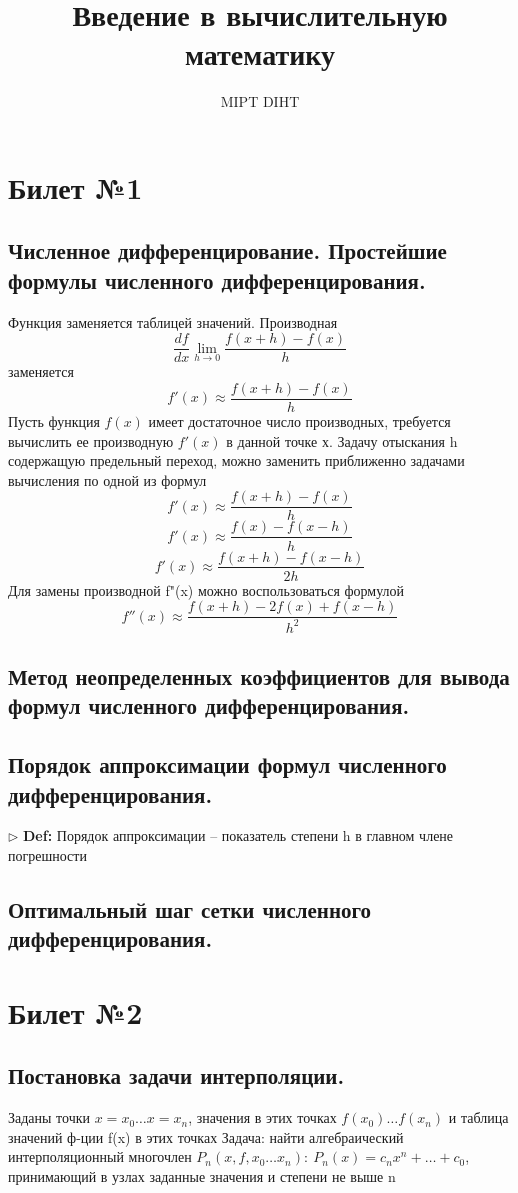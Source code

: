 \documentclass[a4paper]{article}
\title{Введение в вычислительную математику}
\author{MIPT DIHT}
\begin{document}
\maketitle

\section{Билет №1}
\subsection{Численное дифференцирование. Простейшие формулы численного дифференцирования.}
Функция заменяется таблицей значений. Производная $$\frac{df}{dx} \lim_{h \to 0} \frac{f(x + h) - f(x)}{h}$$ заменяется $$f'(x) \approx \frac{f(x + h) - f(x)}{h}$$
Пусть функция $f(x)$ имеет достаточное число производных, требуется вычислить ее производную $f'(x)$ в данной точке х. Задачу отыскания h содержащую предельный переход, можно заменить приближенно задачами вычисления по одной из формул
$$f'(x) \approx \frac{f(x + h) - f(x)}{h}$$
$$f'(x) \approx \frac{f(x) - f(x - h)}{h}$$
$$f'(x) \approx \frac{f(x + h) - f(x - h)}{2h}$$
Для замены производной f"(x) можно воспользоваться формулой
$$f''(x) \approx \frac{f(x + h) - 2f(x) + f(x - h)}{h^2}$$

\subsection{Метод неопределенных коэффициентов для вывода формул численного дифференцирования.}
\subsection{Порядок аппроксимации формул численного дифференцирования.}
$\triangleright$ \textbf{Def:} Порядок аппроксимации – показатель степени h в главном члене погрешности 
\subsection{Оптимальный шаг сетки численного дифференцирования.}

\section{Билет №2}
\subsection{Постановка задачи интерполяции.}
Заданы точки $x=x_0 \ldots x=x_n$, значения в этих точках $f(x_0) \ldots f(x_n)$ и таблица значений ф-ции f(x) в этих точках
Задача: найти алгебраический интерполяционный многочлен $P_n(x,f,x_0 \ldots x_n): \ P_n(x) = c_nx^n + \ldots +c_0$, принимающий в узлах заданные значения и степени не выше n
\end{document}
